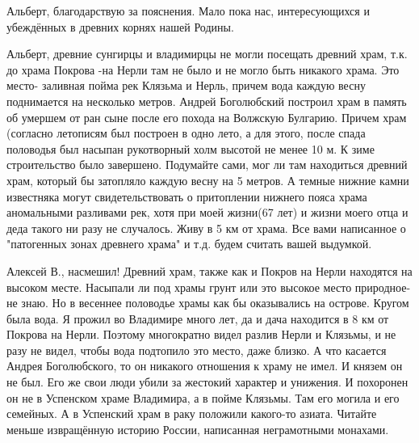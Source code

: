 \begin{itemize}
Альберт, благодарствую за пояснения. Мало пока нас, интересующихся и убеждённых
в древних корнях нашей Родины.


Альберт, древние сунгирцы и владимирцы не могли посещать древний храм, т.к. до
храма Покрова -на Нерли там не было и не могло быть никакого храма. Это место-
заливная пойма рек Клязьма и Нерль, причем вода каждую весну поднимается на
несколько метров. Андрей Боголюбский построил храм в память об умершем от ран
сыне после его похода на Волжскую Булгарию. Причем храм (согласно летописям был
построен в одно лето, а для этого, после спада половодья был насыпан
рукотворный холм высотой не менее 10 м. К зиме строительство было завершено.
Подумайте сами, мог ли там находиться древний храм, который бы затопляло каждую
весну на 5 метров. А темные нижние камни известняка могут свидетельствовать о
притоплении нижнего пояса храма аномальными разливами рек, хотя при моей
жизни(67 лет) и жизни моего отца и деда такого ни разу не случалось. Живу в 5
км от храма. Все вами написанное о "патогенных зонах древнего храма" и т.д.
будем считать вашей выдумкой.


Алексей В., насмешил! Древний храм, также как и Покров на Нерли находятся на
высоком месте. Насыпали ли под храмы грунт или это высокое место природное-не
знаю. Но в весеннее половодье храмы как бы оказывались на острове. Кругом была
вода. Я прожил во Владимире много лет, да и дача находится в 8 км от Покрова на
Нерли. Поэтому многократно видел разлив Нерли и Клязьмы, и не разу не видел,
чтобы вода подтопило это место, даже близко. А что касается Андрея
Боголюбского, то он никакого отношения к храму не имел. И князем он не был. Его
же свои люди убили за жестокий характер и унижения. И похоронен он не в
Успенском храме Владимира, а в пойме Клязьмы. Там его могила и его семейных. А
в Успенский храм в раку положили какого-то азиата. Читайте меньше извращённую
историю России, написанная неграмотными монахами.



\end{itemize}
